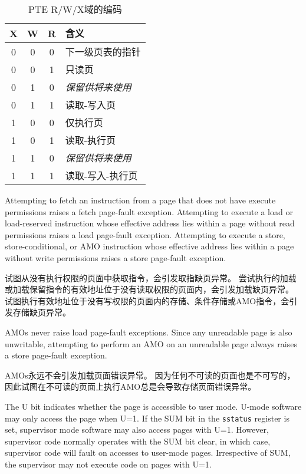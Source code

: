 \begin{table*}[h!]
\begin{center}
\begin{tabular}{|c|c|c||l|}
\hline
X & W & R & 含义 \\
\hline
0 & 0 & 0 & 下一级页表的指针 \\
0 & 0 & 1 & 只读页 \\
0 & 1 & 0 & {\em 保留供将来使用} \\
0 & 1 & 1 & 读取-写入页 \\
1 & 0 & 0 & 仅执行页 \\
1 & 0 & 1 & 读取-执行页 \\
1 & 1 & 0 & {\em 保留供将来使用} \\
1 & 1 & 1 & 读取-写入-执行页 \\
\hline
\end{tabular}
\end{center}
\caption{PTE R/W/X域的编码}
\label{pteperm}
\end{table*}

Attempting to fetch an instruction from a page that does not have execute
permissions raises a fetch page-fault exception.  Attempting to execute
a load or load-reserved instruction whose effective address lies within
a page without read permissions raises a load page-fault exception.
Attempting to execute a store, store-conditional,
or AMO instruction whose effective address lies within a page without
write permissions raises a store page-fault exception.

试图从没有执行权限的页面中获取指令，会引发取指缺页异常。
尝试执行的加载或加载保留指令的有效地址位于没有读取权限的页面内，会引发加载缺页异常。
试图执行有效地址位于没有写权限的页面内的存储、条件存储或AMO指令，会引发存储缺页异常。
\begin{commentary}
AMOs never raise load page-fault exceptions.  Since any unreadable page is
also unwritable, attempting to perform an AMO on an unreadable page always
raises a store page-fault exception.

AMOs永远不会引发加载页面错误异常。
因为任何不可读的页面也是不可写的，因此试图在不可读的页面上执行AMO总是会导致存储页面错误异常。
\end{commentary}

The U bit indicates whether the page is accessible to user mode.
U-mode software may only access the page when U=1.  If the SUM bit
in the {\tt sstatus} register is
set, supervisor mode software may also access pages with U=1.
However, supervisor code normally operates with the SUM bit clear, in
which case, supervisor code will fault on accesses to user-mode pages.
Irrespective of SUM, the supervisor may not execute code on pages with U=1.


